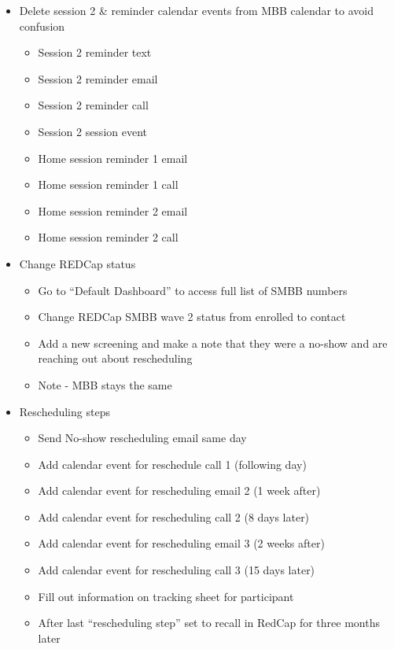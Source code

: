 \documentclass[]{book}
\providecommand{\tightlist}{%
  \setlength{\itemsep}{0pt}\setlength{\parskip}{0pt}}
\begin{document}
\begin{itemize}
\tightlist
\item
  Delete session 2 \& reminder calendar events from MBB calendar to avoid confusion

  \begin{itemize}
  \tightlist
  \item
    Session 2 reminder text
  \item
    Session 2 reminder email
  \item
    Session 2 reminder call
  \item
    Session 2 session event\\
  \item
    Home session reminder 1 email
  \item
    Home session reminder 1 call
  \item
    Home session reminder 2 email
  \item
    Home session reminder 2 call
  \end{itemize}
\item
  Change REDCap status

  \begin{itemize}
  \tightlist
  \item
    Go to ``Default Dashboard'' to access full list of SMBB numbers
  \item
    Change REDCap SMBB wave 2 status from enrolled to contact
  \item
    Add a new screening and make a note that they were a no-show and are reaching out about rescheduling
  \item
    Note - MBB stays the same
  \end{itemize}
\item
  Rescheduling steps

  \begin{itemize}
  \tightlist
  \item
    Send No-show rescheduling email same day\\
  \item
    Add calendar event for reschedule call 1 (following day)\\
  \item
    Add calendar event for rescheduling email 2 (1 week after)\\
  \item
    Add calendar event for rescheduling call 2 (8 days later)\\
  \item
    Add calendar event for rescheduling email 3 (2 weeks after)\\
  \item
    Add calendar event for rescheduling call 3 (15 days later)\\
  \item
    Fill out information on tracking sheet for participant\\
  \item
    After last ``rescheduling step'' set to recall in RedCap for three months later
  \end{itemize}
\end{itemize}
\end{document}
